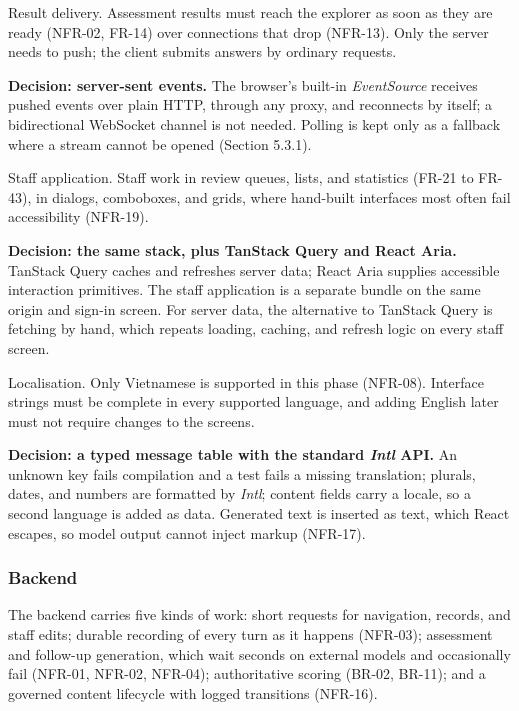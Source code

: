 Result delivery. Assessment results must reach the explorer as soon as they are ready (NFR-02, FR-14) over connections that drop (NFR-13). Only the server needs to push; the client submits answers by ordinary requests.

\textbf{Decision: server-sent events.} The browser's built-in \textit{EventSource} receives pushed events over plain HTTP, through any proxy, and reconnects by itself\cite{r144}; a bidirectional WebSocket channel is not needed. Polling is kept only as a fallback where a stream cannot be opened (Section 5.3.1).

Staff application. Staff work in review queues, lists, and statistics (FR-21 to FR-43), in dialogs, comboboxes, and grids, where hand-built interfaces most often fail accessibility (NFR-19).

\textbf{Decision: the same stack, plus TanStack Query and React Aria.} TanStack Query caches and refreshes server data\cite{r145}; React Aria supplies accessible interaction primitives\cite{r146}. The staff application is a separate bundle on the same origin and sign-in screen. For server data, the alternative to TanStack Query is fetching by hand, which repeats loading, caching, and refresh logic on every staff screen.

Localisation. Only Vietnamese is supported in this phase (NFR-08). Interface strings must be complete in every supported language, and adding English later must not require changes to the screens.

\textbf{Decision: a typed message table with the standard \textit{Intl} API.} An unknown key fails compilation and a test fails a missing translation; plurals, dates, and numbers are formatted by \textit{Intl}\cite{r147}; content fields carry a locale, so a second language is added as data. Generated text is inserted as text, which React escapes, so model output cannot inject markup (NFR-17)\cite{r148}.

\subsubsection{Backend}

The backend carries five kinds of work: short requests for navigation, records, and staff edits; durable recording of every turn as it happens (NFR-03); assessment and follow-up generation, which wait seconds on external models and occasionally fail (NFR-01, NFR-02, NFR-04); authoritative scoring (BR-02, BR-11); and a governed content lifecycle with logged transitions (NFR-16).

